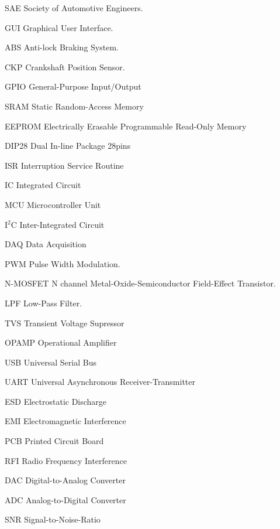 \begin{siglas}
  \item[SAE] Society of Automotive Engineers.
  \item[GUI] Graphical User Interface.
  \item[ABS] Anti-lock Braking System.
  \item[CKP] Crankshaft Position Sensor.
  \item[GPIO] General-Purpose Input/Output
  \item[SRAM] Static Random-Access Memory
  \item[EEPROM] Electrically Erasable Programmable Read-Only Memory
  \item[DIP28] Dual In-line Package 28pins
  \item[ISR] Interruption Service Routine
  \item[IC] Integrated Circuit
  \item[MCU] Microcontroller Unit
  \item[I$^2$C] Inter-Integrated Circuit
  \item[DAQ] Data Acquisition
  \item[PWM] Pulse Width Modulation.
  \item[N-MOSFET] N channel Metal-Oxide-Semiconductor Field-Effect Transistor.
  \item[LPF] Low-Pass Filter.
  \item[TVS] Transient Voltage Supressor
  \item[OPAMP] Operational Amplifier
  \item[USB] Universal Serial Bus
  \item[UART] Universal Asynchronous Receiver-Transmitter
  \item[ESD] Electrostatic Discharge
  \item[EMI] Electromagnetic Interference
  \item[PCB] Printed Circuit Board
  \item[RFI] Radio Frequency Interference
  \item[DAC] Digital-to-Analog Converter
  \item[ADC] Analog-to-Digital Converter
  \item[SNR] Signal-to-Noise-Ratio
\end{siglas}
